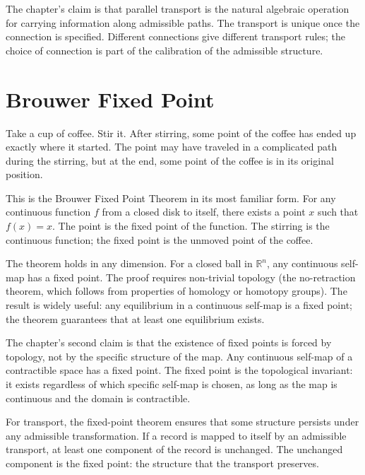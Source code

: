 The chapter's claim is that parallel transport is the natural
algebraic operation for carrying information along admissible paths.
The transport is unique once the connection is specified. Different
connections give different transport rules; the choice of
connection is part of the calibration of the admissible structure.

\section{Brouwer Fixed Point}
\label{se:brouwer-fixed-point}

Take a cup of coffee. Stir it. After stirring, some point of the
coffee has ended up exactly where it started. The point may have
traveled in a complicated path during the stirring, but at the end,
some point of the coffee is in its original position.

This is the Brouwer Fixed Point Theorem in its most familiar form.
For any continuous function $f$ from a closed disk to itself, there
exists a point $x$ such that $f(x) = x$. The point is the fixed
point of the function. The stirring is the continuous function;
the fixed point is the unmoved point of the coffee.

The theorem holds in any dimension. For a closed ball in
$\mathbb{R}^n$, any continuous self-map has a fixed point. The
proof requires non-trivial topology (the no-retraction theorem,
which follows from properties of homology or homotopy groups).
The result is widely useful: any equilibrium in a continuous
self-map is a fixed point; the theorem guarantees that at least
one equilibrium exists.

The chapter's second claim is that the existence of fixed points is
forced by topology, not by the specific structure of the map. Any
continuous self-map of a contractible space has a fixed point.
The fixed point is the topological invariant: it exists regardless
of which specific self-map is chosen, as long as the map is
continuous and the domain is contractible.

For transport, the fixed-point theorem ensures that some structure
persists under any admissible transformation. If a record is
mapped to itself by an admissible transport, at least one
component of the record is unchanged. The unchanged component is
the fixed point: the structure that the transport preserves.


